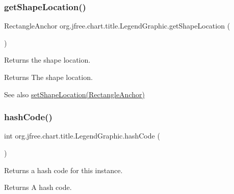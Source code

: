 \subsubsection{\texorpdfstring{get\+Shape\+Location()}{getShapeLocation()}}
{\footnotesize\ttfamily Rectangle\+Anchor org.\+jfree.\+chart.\+title.\+Legend\+Graphic.\+get\+Shape\+Location (\begin{DoxyParamCaption}{ }\end{DoxyParamCaption})}

Returns the shape location.

\begin{DoxyReturn}{Returns}
The shape location.
\end{DoxyReturn}
\begin{DoxySeeAlso}{See also}
\mbox{\hyperlink{classorg_1_1jfree_1_1chart_1_1title_1_1_legend_graphic_a24126e36b9ff60d4b4616943894b5d4b}{set\+Shape\+Location(\+Rectangle\+Anchor)}} 
\end{DoxySeeAlso}
\mbox{\label{classorg_1_1jfree_1_1chart_1_1title_1_1_legend_graphic_a3e1f7d04bbeb0e9348e90e94b50ce6b4}} 
\subsubsection{\texorpdfstring{hash\+Code()}{hashCode()}}
{\footnotesize\ttfamily int org.\+jfree.\+chart.\+title.\+Legend\+Graphic.\+hash\+Code (\begin{DoxyParamCaption}{ }\end{DoxyParamCaption})}

Returns a hash code for this instance.

\begin{DoxyReturn}{Returns}
A hash code. 
\end{DoxyReturn}
\mbox{\label{classorg_1_1jfree_1_1chart_1_1title_1_1_legend_graphic_ad674b4beaa7cabe7f5b50e7c47a3e87d}} 
